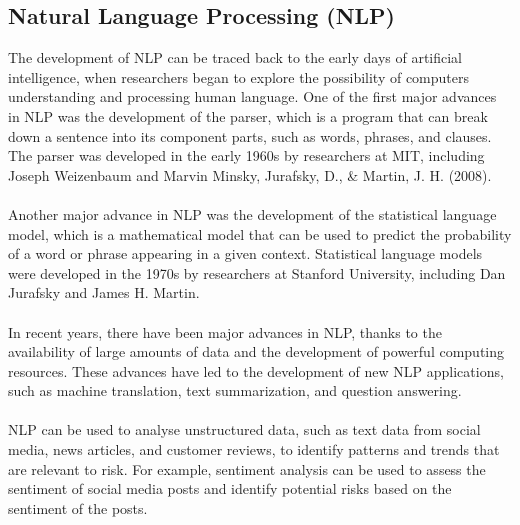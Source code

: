 \subsection{Natural Language Processing (NLP)}

The development of NLP can be traced back to the early days of artificial intelligence, when researchers began to 
explore the possibility of computers understanding and processing human language. One of the first major advances 
in NLP was the development of the parser, which is a program that can break down a sentence into its component 
parts, such as words, phrases, and clauses. The parser was developed in the early 1960s by researchers at MIT, 
including Joseph Weizenbaum and Marvin Minsky, Jurafsky, D., \& Martin, J. H. (2008).\\\\
Another major advance in NLP was the development of the statistical language model, which is a mathematical model 
that can be used to predict the probability of a word or phrase appearing in a given context. Statistical language 
models were developed in the 1970s by researchers at Stanford University, including Dan Jurafsky and James H. Martin.\\\\
In recent years, there have been major advances in NLP, thanks to the availability of large amounts of data and the 
development of powerful computing resources. These advances have led to the development of new NLP applications, 
such as machine translation, text summarization, and question answering.\\\\
NLP can be used to analyse unstructured data, such as text data from social media, news articles, and customer
reviews, to identify patterns and trends that are relevant to risk. For example, sentiment analysis can be used
to assess the sentiment of social media posts and identify potential risks based on the sentiment of the posts.

